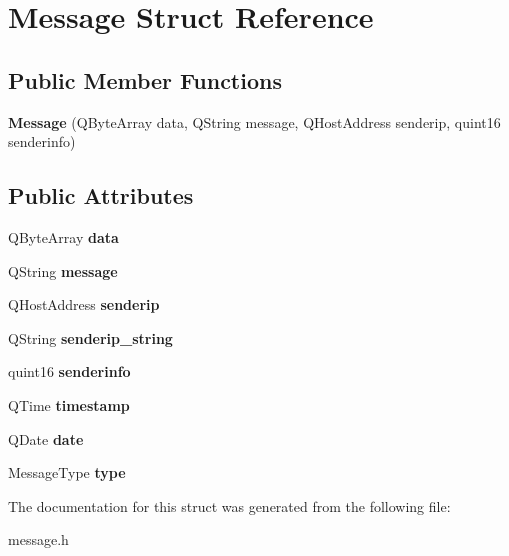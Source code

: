 \hypertarget{struct_message}{}\section{Message Struct Reference}
\label{struct_message}
\subsection*{Public Member Functions}
\begin{DoxyCompactItemize}
\item 
\hypertarget{struct_message_aa3f028e2b9674d7eb1712129deb01382}{}{\bfseries Message} (Q\+Byte\+Array data, Q\+String message, Q\+Host\+Address senderip, quint16 senderinfo)\label{struct_message_aa3f028e2b9674d7eb1712129deb01382}

\end{DoxyCompactItemize}
\subsection*{Public Attributes}
\begin{DoxyCompactItemize}
\item 
\hypertarget{struct_message_a3ef7dc9dd3f7d356f48fe76fd97800a5}{}Q\+Byte\+Array {\bfseries data}\label{struct_message_a3ef7dc9dd3f7d356f48fe76fd97800a5}

\item 
\hypertarget{struct_message_aa1827946747d01ed5ef325cba3d86e1b}{}Q\+String {\bfseries message}\label{struct_message_aa1827946747d01ed5ef325cba3d86e1b}

\item 
\hypertarget{struct_message_a03891c75eb0cdc274337cb2e7ac11031}{}Q\+Host\+Address {\bfseries senderip}\label{struct_message_a03891c75eb0cdc274337cb2e7ac11031}

\item 
\hypertarget{struct_message_a38dbd0cc60b22aeed826ac30e9567da5}{}Q\+String {\bfseries senderip\+\_\+string}\label{struct_message_a38dbd0cc60b22aeed826ac30e9567da5}

\item 
\hypertarget{struct_message_ad1ada733d211a5270a164a1da128f6c0}{}quint16 {\bfseries senderinfo}\label{struct_message_ad1ada733d211a5270a164a1da128f6c0}

\item 
\hypertarget{struct_message_a049ad3d2cc26be505da1f4550805ec55}{}Q\+Time {\bfseries timestamp}\label{struct_message_a049ad3d2cc26be505da1f4550805ec55}

\item 
\hypertarget{struct_message_a037095a68df489f0da05ca6d3494d7d6}{}Q\+Date {\bfseries date}\label{struct_message_a037095a68df489f0da05ca6d3494d7d6}

\item 
\hypertarget{struct_message_a6fc78df47d3755e088e7c658db565fc5}{}Message\+Type {\bfseries type}\label{struct_message_a6fc78df47d3755e088e7c658db565fc5}

\end{DoxyCompactItemize}


The documentation for this struct was generated from the following file\+:\begin{DoxyCompactItemize}
\item 
message.\+h\end{DoxyCompactItemize}
